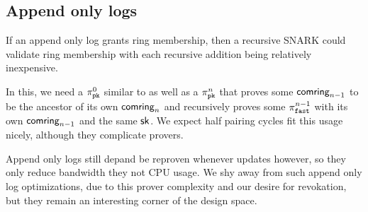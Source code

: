 \subsection{Append only logs}

If an append only log grants ring membership, then a recursive SNARK
could validate ring membership with each recursive addition being
relatively inexpensive.

In this, we need a $\pi_{\mathtt{pk}}^0$ similar to \pipk as well as a
$\pi_{\mathtt{pk}}^n$ that proves some $\mathsf{comring}_{n-1}$ to be the ancestor of
its own $\mathsf{comring}_n$ and recursively proves some $\pi_{\mathtt{fast}}^{n-1}$ with
its own $\mathsf{comring}_{n-1}$ and the same $\mathsf{sk}$.
We expect half pairing cycles fit this usage nicely, although they complicate provers.

Append only logs still depand \pipk be reproven whenever
\ctx updates however, so they only reduce bandwidth they not CPU usage.
We shy away from such append only log optimizations, due to this
prover complexity and our desire for revokation, but
 they remain an interesting corner of the design space.
